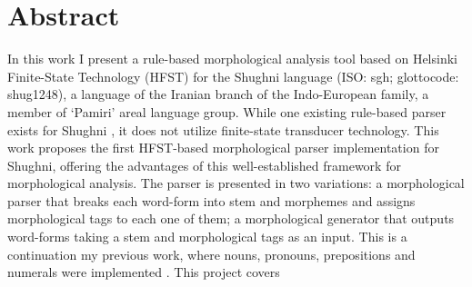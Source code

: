 \section*{Abstract}

In this work I present a rule-based morphological analysis tool based on Helsinki Finite-State Technology (HFST) for the Shughni language (ISO: sgh; glottocode: shug1248), a language of the Iranian branch of the Indo-European family, a member of `Pamiri' areal language group. While one existing rule-based parser exists for Shughni \parencite{melenchenko_2021_parser}, it does not utilize finite-state transducer technology. This work proposes the first HFST-based morphological parser implementation for Shughni, offering the advantages of this well-established framework for morphological analysis. The parser is presented in two variations: a morphological parser that breaks each word-form into stem and morphemes and assigns morphological tags to each one of them; a morphological generator that outputs word-forms taking a stem and morphological tags as an input.  This is a continuation my previous work, where nouns, pronouns, prepositions and numerals were implemented \parencite{osorgin_2024_twol}. This project covers 


\newpage